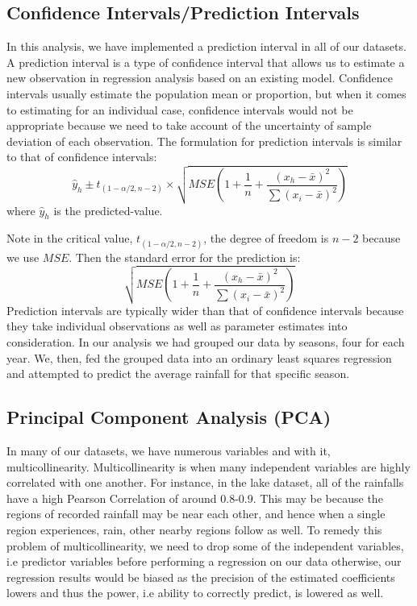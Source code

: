\documentclass[12pt, letterpaper]{article}
\begin{document}
\subsection{Confidence Intervals/Prediction Intervals}
In this analysis, we have implemented a prediction interval in all of our datasets. A prediction interval is a type of confidence interval that allows us to estimate a new observation in regression analysis based on an existing model. Confidence intervals usually estimate the population mean or proportion, but when it comes to estimating for an individual case, confidence intervals would not be appropriate because we need to take account of the uncertainty of sample deviation of each observation. The formulation for prediction intervals is similar to that of confidence intervals: 
$$\hat{y}_h\pm t_{(1-\alpha/2 , n-2)}\times \sqrt{MSE \left (1 + \frac{1}{n} + \frac{(x_h-\bar{x})^2}{\sum (x_i-\bar{x})^2} \right )}$$
where $\hat{y}_h$ is the predicted-value.

Note in the critical value, $t_{(1-\alpha/2, n-2)}$, the degree of freedom is $n-2$ because we use $MSE$. Then the standard error for the prediction is: $$\sqrt{MSE \left (1 + \frac{1}{n} + \frac{(x_h-\bar{x})^2}{\sum (x_i-\bar{x})^2} \right )}$$
Prediction intervals are typically wider than that of confidence intervals because they take individual observations as well as parameter estimates into consideration. In our analysis we had grouped our data by seasons, four for each year. We, then, fed the grouped data into an ordinary least squares regression and attempted to predict the average rainfall for that specific season. 

\subsection{Principal Component Analysis (PCA)}
In many of our datasets, we have numerous variables and with it, multicollinearity. Multicollinearity is when many independent variables are highly correlated with one another. For instance, in the lake dataset, all of the rainfalls have a high Pearson Correlation of around 0.8-0.9. This may be because the regions of recorded rainfall may be near each other, and hence when a single region experiences, rain, other nearby regions follow as well. To remedy this problem of multicollinearity, we need to drop some of the independent variables, i.e predictor variables before performing a regression on our data otherwise, our regression results would be biased as the precision of the estimated coefficients lowers and thus the power, i.e ability to correctly predict, is lowered as well.
\end{document}

